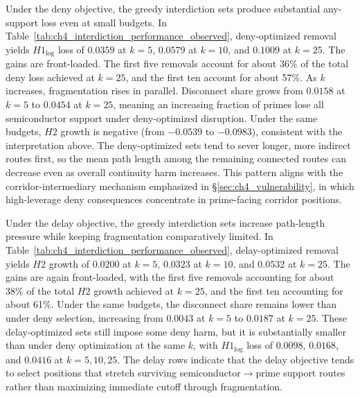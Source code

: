 Under the deny objective, the greedy interdiction sets produce substantial any-support loss even at small budgets. In Table~\ref{tab:ch4_interdiction_performance_observed}, deny-optimized removal yields $H1_{\log}$ loss of $0.0359$ at $k=5$, $0.0579$ at $k=10$, and $0.1009$ at $k=25$. The gains are front-loaded. The first five removals account for about 36\% of the total deny loss achieved at $k=25$, and the first ten account for about 57\%. As $k$ increases, fragmentation rises in parallel. Disconnect share grows from $0.0158$ at $k=5$ to $0.0454$ at $k=25$, meaning an increasing fraction of primes lose all semiconductor support under deny-optimized disruption. Under the same budgets, $H2$ growth is negative (from $-0.0539$ to $-0.0983$), consistent with the interpretation above. The deny-optimized sets tend to sever longer, more indirect routes first, so the mean path length among the remaining connected routes can decrease even as overall continuity harm increases. This pattern aligns with the corridor-intermediary mechanism emphasized in \S\ref{sec:ch4_vulnerability}, in which high-leverage deny consequences concentrate in prime-facing corridor positions.

Under the delay objective, the greedy interdiction sets increase path-length pressure while keeping fragmentation comparatively limited. In Table~\ref{tab:ch4_interdiction_performance_observed}, delay-optimized removal yields $H2$ growth of $0.0200$ at $k=5$, $0.0323$ at $k=10$, and $0.0532$ at $k=25$. The gains are again front-loaded, with the first five removals accounting for about 38\% of the total $H2$ growth achieved at $k=25$, and the first ten accounting for about 61\%. Under the same budgets, the disconnect share remains lower than under deny selection, increasing from $0.0043$ at $k=5$ to $0.0187$ at $k=25$. These delay-optimized sets still impose some deny harm, but it is substantially smaller than under deny optimization at the same $k$, with $H1_{\log}$ loss of $0.0098$, $0.0168$, and $0.0416$ at $k=5,10,25$. The delay rows indicate that the delay objective tends to select positions that stretch surviving semiconductor$\rightarrow$prime support routes rather than maximizing immediate cutoff through fragmentation.

